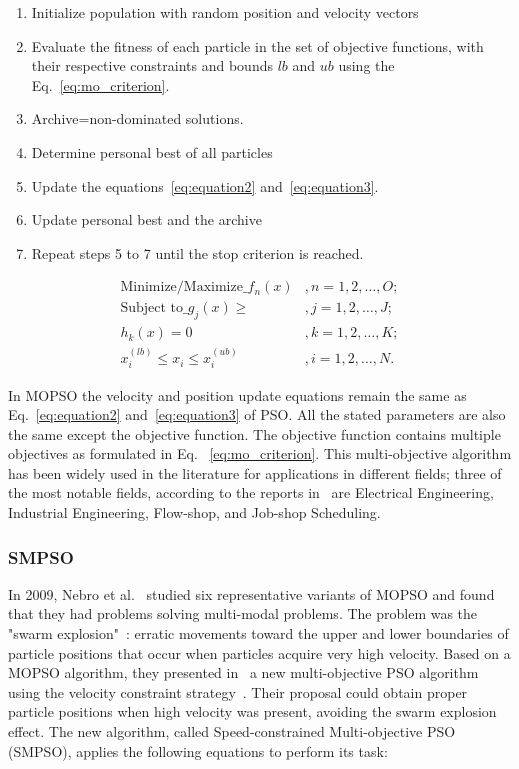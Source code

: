 \begin{enumerate}
    \item Initialize population with random position and velocity vectors
    \item Evaluate the fitness of each particle in the set of objective functions, with their respective constraints and bounds $lb$ and $ub$ using the Eq.~\eqref{eq:mo_criterion}.
    \item Archive=non-dominated solutions.
    \item Determine personal best of all particles
    \item Update the equations~\eqref{eq:equation2} and~\eqref{eq:equation3}.
    \item Update personal best and the archive
    \item Repeat steps 5 to 7 until the stop criterion is reached.
\end{enumerate}

\begin{equation}
\begin{split}\label{eq:mo_criterion}
    \text{Minimize/Maximize} \_ f_n (x) &, n=1,2,\dots,O;\\
    \text{Subject to} \_ g_j(x) \geq &, j = 1,2,\dots,J;\\
    h_k(x)=0 &, k=1,2,\dots,K;\\
    x_i^{(lb)} \leq x_i \leq x_i^{(ub)} &, i=1,2,\dots,N.
\end{split}
\end{equation} 


In MOPSO the velocity and position update equations remain the same as Eq.~\eqref{eq:equation2} and~\eqref{eq:equation3} of PSO. All the stated parameters are also the same except the objective function. The objective function contains multiple objectives as formulated in Eq. ~\eqref{eq:mo_criterion}.
This multi-objective algorithm has been widely used in the literature for applications in different fields; three of the most notable fields, according to the reports in~\cite{lalwani2013comprehensive} are Electrical Engineering, Industrial Engineering, Flow-shop, and Job-shop Scheduling.

\subsubsection{SMPSO}

In 2009, Nebro et al.~\cite{nebro2009smpso} studied six representative variants of MOPSO and found that they had problems solving multi-modal problems. The problem was the "swarm explosion"~\cite{clerc2002particle}: erratic movements toward the upper and lower boundaries of particle positions that occur when particles acquire very high velocity. Based on a MOPSO algorithm, they presented in~\cite{nebro2009smpso} a new multi-objective PSO algorithm using the velocity constraint strategy~\cite{clerc2002particle}. Their proposal could obtain proper particle positions when high velocity was present, avoiding the swarm explosion effect. The new algorithm, called Speed-constrained Multi-objective PSO (SMPSO), applies the following equations to perform its task:

